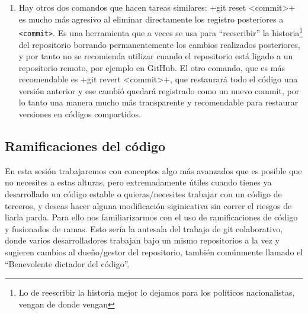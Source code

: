 \documentclass[a4paper,10pt]{article}
\begin{document}
\begin{enumerate}
    \item Hay otros dos comandos que hacen tareas similares:     \cverb+git reset <commit>+ es mucho más agresivo al eliminar directamente los registro posteriores a \verb+<commit>+. Es una herramienta que a veces se usa para ``reescribir'' la historia\footnote{Lo de reescribir la historia mejor lo dejamos para los políticos nacionalistas, vengan de donde vengan} del repositorio borrando permanentemente los cambios realizados posteriores, y por tanto no se recomienda utilizar cuando el repositorio está ligado a un repositorio remoto, por ejemplo en GitHub. El otro comando, que es más recomendable es \cverb+git revert <commit>+, que restaurará todo el código una versión anterior y ese cambió quedará registrado como un nuevo commit, por lo tanto una manera mucho más transparente y recomendable para restaurar versiones en códigos compartidos.
    
   \end{enumerate}
   
  \subsection{Ramificaciones del código}
    En esta sesión trabajaremos con conceptos algo más avanzados que es posible que no necesites a estas alturas, pero extremadamente útiles cuando tienes ya desarrollado un código estable o quieras/necesites trabajar con un código de terceros, y deseas hacer alguna modificación siginicativa sin correr el riesgos de liarla parda. Para ello nos familiarizarmos con el uso de ramificaciones de código y fusionados de ramas. Esto sería la antesala del trabajo de git colaborativo, donde varios desarrolladores trabajan bajo un mismo repositorios a la vez y sugieren cambios al dueño/gestor del repositorio, también comúnmente llamado el ``Benevolente dictador del código''.
    
\end{document}
